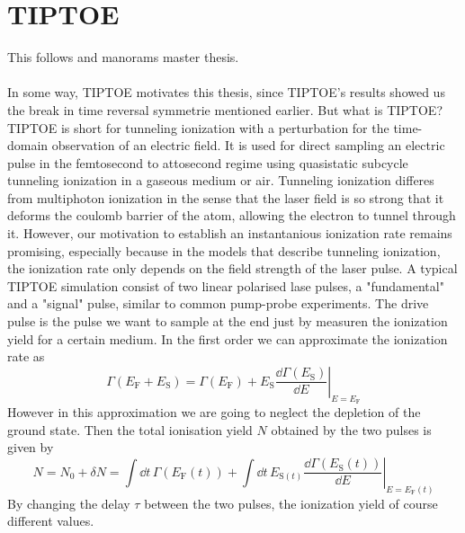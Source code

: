 \section{TIPTOE}
This follows \cite{Park:18} and manorams master thesis.\\\\
In some way, TIPTOE motivates this thesis, since TIPTOE's results showed us the break in time reversal symmetrie mentioned earlier.
But what is TIPTOE? TIPTOE \cite{Park:18} is short for tunneling ionization with a perturbation for the time-domain observation of an electric field. 
It is used for direct sampling an electric pulse in the femtosecond to attosecond regime using quasistatic subcycle tunneling ionization in a gaseous medium or air.
Tunneling ionization differes from multiphoton ionization in the sense that the laser field is so strong that it deforms the coulomb barrier of the atom, allowing the electron to tunnel through it.
However, our motivation to establish an instantanious ionization rate remains promising, especially because in the models that describe tunneling ionization, the ionization rate only depends on the field strength of the laser pulse.
A typical TIPTOE simulation consist of two linear polarised lase pulses, a "fundamental" and a "signal" pulse, similar to common pump-probe experiments. 
The drive pulse is the pulse we want to sample at the end just by measuren the ionization yield for a certain medium.
In the first order we can approximate the ionization rate as
\begin{equation*}
    \Gamma(E_{\mathrm{F}}+E_{\mathrm{S}})=\Gamma(E_{\mathrm{F}})+\left.E_{\mathrm{S}}\frac{\dd \Gamma(E_{\mathrm{S}})}{\dd E}\right|_{E=E_{\mathrm{F}}}
\end{equation*}
However in this approximation we are going to neglect the depletion of the ground state. 
Then the total ionisation yield $N$ obtained by the two pulses is given by
\begin{equation*}
    N=N_0+\delta N = \int \dd t\,\Gamma(E_{\mathrm{F}}(t))+\int \dd t\,E_{\mathrm{S}(t)}\left.\frac{\dd \Gamma(E_{\mathrm{S}}(t))}{\dd E}\right|_{E=E_{\mathrm{F}}(t)}
\end{equation*}
By changing the delay $\tau$ between the two pulses, the ionization yield of course different values.
